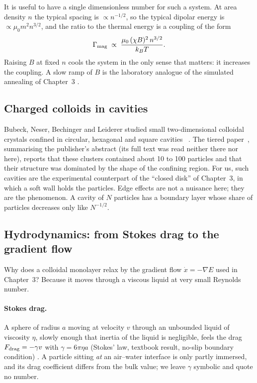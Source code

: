It is useful to have a single dimensionless number for such a system. At area density $n$ the typical spacing is
$\propto n^{-1/2}$, so the typical dipolar energy is $\propto \mu_0 m^2 n^{3/2}$, and the ratio to the thermal
energy is a coupling of the form
\[
\Gamma_{\rm mag}\;\propto\;\frac{\mu_0\,(\chi B)^2\, n^{3/2}}{k_BT}.
\]
Raising $B$ at fixed $n$ cools the system in the only sense that matters: it increases the coupling. A slow
ramp of $B$ is the laboratory analogue of the simulated annealing of Chapter~3 \tierC.

\subsection{Charged colloids in cavities}
Bubeck, Neser, Bechinger and Leiderer studied small two-dimensional colloidal crystals confined in circular,
hexagonal and square cavities~\cite{bubeck} \tierL. The tiered paper~\cite{tiered}, summarising the publisher's
abstract (its full text was read neither there nor here), reports that these clusters contained about 10 to 100
particles and that their structure was dominated by the shape of the confining region. For us, such cavities are the experimental counterpart of the ``closed disk'' of
Chapter~3, in which a soft wall holds the particles. Edge effects are not a nuisance here; they are the phenomenon.
A cavity of $N$ particles has a boundary layer whose share of particles decreases only like $N^{-1/2}$.

\subsection{Hydrodynamics: from Stokes drag to the gradient flow}\label{sec:ch4-stokes}
Why does a colloidal monolayer relax by the gradient flow $\dot x = -\nabla E$ used in Chapter~3? Because it moves
through a viscous liquid at very small Reynolds number.

\paragraph{Stokes drag.} A sphere of radius $a$ moving at velocity $v$ through an unbounded liquid of viscosity
$\eta$, slowly enough that inertia of the liquid is negligible, feels the drag $F_{\rm drag}=-\gamma v$ with
$\gamma = 6\pi\eta a$ (Stokes' law, textbook result, no-slip boundary condition) \tierC. A particle sitting
\emph{at} an air--water interface is only partly immersed, and its drag coefficient differs from the bulk value;
we leave $\gamma$ symbolic and quote no number.

